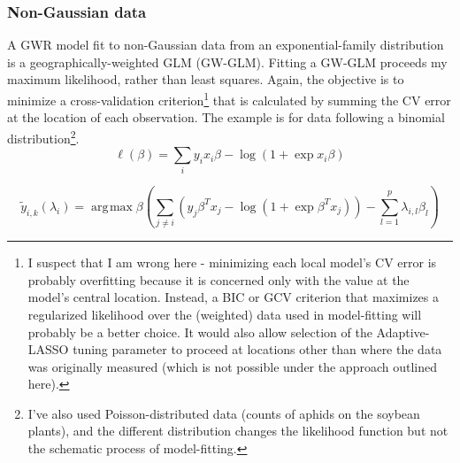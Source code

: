 \documentclass[10pt]{amsart}
\DeclareMathOperator*{\argmax}{\arg\!\max}
\begin{document}
		\subsubsection{Non-Gaussian data} A GWR model fit to non-Gaussian data from an exponential-family distribution is a geographically-weighted GLM (GW-GLM). Fitting a GW-GLM proceeds my maximum likelihood, rather than least squares. Again, the objective is to minimize a cross-validation criterion\footnote{I suspect that I am wrong here - minimizing each local model's CV error is probably overfitting because it is concerned only with the value at the model's central location. Instead, a BIC or GCV criterion that maximizes a regularized likelihood over the (weighted) data used in model-fitting will probably be a better choice. It would also allow selection of the Adaptive-LASSO tuning parameter to proceed at locations other than where the data was originally measured (which is not possible under the approach outlined here).} that is calculated by summing the CV error at the location of each observation. The example is for data following a binomial distribution\footnote{I've also used Poisson-distributed data (counts of aphids on the soybean plants), and the different distribution changes the likelihood function but not the schematic process of model-fitting.}.
		\[
			\ell(\beta) = \sum_i y_i x_i \beta - \log{(1+\exp{x_i \beta})} 
		\]
		
		\[
			\tilde{y}_{i,k}(\lambda_i) = \argmax \beta \left( \sum_{j \ne i} (y_j \beta^T x_j - \log(1+\exp{\beta^T x_j}))  -  \sum_{l=1}^p \lambda_{i,l} \beta_l \right)
		\]
	




\end{document}
